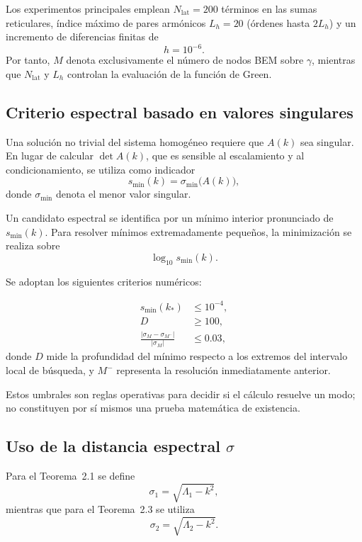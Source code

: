 \documentclass[11pt]{article}
\begin{document}
Los experimentos principales emplean \(N_{\mathrm{lat}}=200\) términos en las
sumas reticulares, índice máximo de pares armónicos \(L_h=20\) (órdenes hasta
\(2L_h\)) y un incremento de diferencias finitas de
\[
h=10^{-6}.
\]
Por tanto, \(M\) denota exclusivamente el número de nodos BEM sobre \(\gamma\), mientras que
\(N_{\mathrm{lat}}\) y \(L_h\) controlan la evaluación de la función de Green.

\subsection{Criterio espectral basado en valores singulares}

Una solución no trivial del sistema homogéneo requiere que \(A(k)\) sea singular. En lugar de calcular
\(\det A(k)\), que es sensible al escalamiento y al condicionamiento, se utiliza como indicador
\begin{equation}
s_{\min}(k)
=
\sigma_{\min}\bigl(A(k)\bigr),
\label{eq:smallest_sv}
\end{equation}
donde \(\sigma_{\min}\) denota el menor valor singular.

Un candidato espectral se identifica por un mínimo interior pronunciado de \(s_{\min}(k)\). Para resolver mínimos extremadamente pequeños, la minimización se realiza sobre
\[
\log_{10}s_{\min}(k).
\]

Se adoptan los siguientes criterios numéricos:

\begin{align}
s_{\min}(k_*)&\leq10^{-4},
\label{eq:criterion_sv}\\
D&\geq100,
\label{eq:criterion_drop}\\
\frac{|\sigma_M-\sigma_{M^-}|}{|\sigma_M|}
&\leq0.03,
\label{eq:criterion_mesh}
\end{align}
donde \(D\) mide la profundidad del mínimo respecto a los extremos del intervalo local de búsqueda, y \(M^-\) representa la resolución inmediatamente anterior.

Estos umbrales son reglas operativas para decidir si el cálculo resuelve un modo; no constituyen por sí mismos una prueba matemática de existencia.

\subsection{Uso de la distancia espectral \texorpdfstring{\(\sigma\)}{sigma}}

Para el Teorema~2.1 se define
\begin{equation}
\sigma_1
=
\sqrt{\Lambda_1-k^2},
\end{equation}
mientras que para el Teorema~2.3 se utiliza
\begin{equation}
\sigma_2
=
\sqrt{\Lambda_2-k^2}.
\end{equation}
\end{document}

